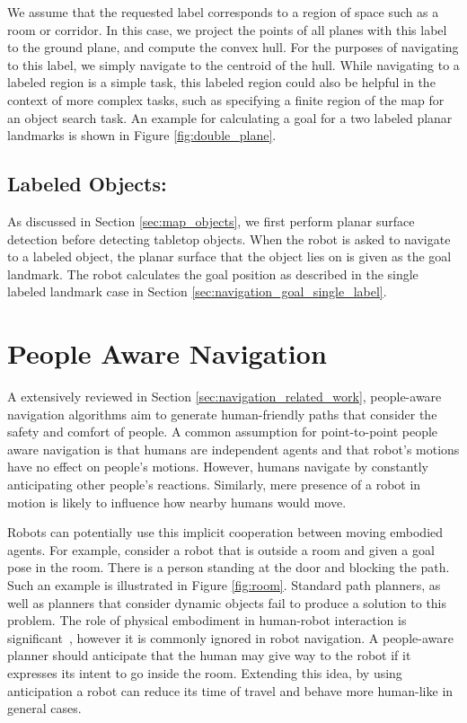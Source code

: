 We assume that the requested label corresponds to a region of space such as a room or corridor. In this case, we project the points of all planes with this label to the ground plane, and compute the convex hull. For the purposes of navigating to this label, we simply navigate to the centroid of the hull. While navigating to a labeled region is a simple task, this labeled region could also be helpful in the context of more complex tasks, such as specifying a finite region of the map for an object search task. An example for calculating a goal for a two labeled planar landmarks is shown in Figure \ref{fig:double_plane}. 


\subsection{Labeled Objects:} As discussed in Section \ref{sec:map_objects}, we first perform planar surface detection before detecting tabletop objects. When the robot is asked to navigate to a labeled object, the planar surface that the object lies on is given as the goal landmark. The robot calculates the goal position as described in the single labeled landmark case in Section \ref{sec:navigation_goal_single_label}.

\section{People Aware Navigation}
\label{sec:navigation_people_aware_navigation}

A extensively reviewed in Section \ref{sec:navigation_related_work}, people-aware navigation algorithms aim to generate human-friendly paths that consider the safety and comfort of people. A common assumption for point-to-point people aware navigation is that humans are independent agents and that robot's motions have no effect on people's motions. However, humans navigate by constantly anticipating other people's reactions. Similarly, mere presence of a robot in motion is likely to influence how nearby humans would move. 

Robots can potentially use this implicit cooperation between moving embodied agents. For example, consider a robot that is outside a room and given a goal pose in the room. There is a person standing at the door and blocking the path. Such an example is illustrated in Figure \ref{fig:room}. Standard path planners, as well as planners that consider dynamic objects fail to produce a solution to this problem. The role of physical embodiment in human-robot interaction is significant~\cite{wainer2006role}, however it is commonly ignored in robot navigation. A people-aware planner should anticipate that the human may give way to the robot if it expresses its intent to go inside the room. Extending this idea, by using anticipation a robot can reduce its time of travel and behave more human-like in general cases.

